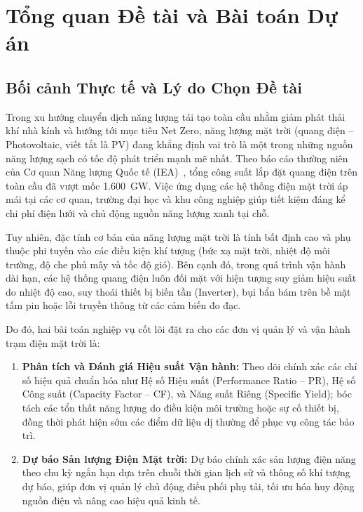 \documentclass[12pt, a4paper]{report}
\begin{document}
\chapter{Tổng quan Đề tài và Bài toán Dự án}
\label{chap:tongquan}

\section{Bối cảnh Thực tế và Lý do Chọn Đề tài}
\label{sec:lydo}

Trong xu hướng chuyển dịch năng lượng tái tạo toàn cầu nhằm giảm phát thải khí nhà kính và hướng tới mục tiêu Net Zero, năng lượng mặt trời (quang điện -- Photovoltaic, viết tắt là PV) đang khẳng định vai trò là một trong những nguồn năng lượng sạch có tốc độ phát triển mạnh mẽ nhất. Theo báo cáo thường niên của Cơ quan Năng lượng Quốc tế (IEA)~\cite{iea2023pvps}, tổng công suất lắp đặt quang điện trên toàn cầu đã vượt mốc 1.600~GW. Việc ứng dụng các hệ thống điện mặt trời áp mái tại các cơ quan, trường đại học và khu công nghiệp giúp tiết kiệm đáng kể chi phí điện lưới và chủ động nguồn năng lượng xanh tại chỗ.

Tuy nhiên, đặc tính cơ bản của năng lượng mặt trời là tính bất định cao và phụ thuộc phi tuyến vào các điều kiện khí tượng (bức xạ mặt trời, nhiệt độ môi trường, độ che phủ mây và tốc độ gió). Bên cạnh đó, trong quá trình vận hành dài hạn, các hệ thống quang điện luôn đối mặt với hiện tượng suy giảm hiệu suất do nhiệt độ cao, suy thoái thiết bị biến tần (Inverter), bụi bẩn bám trên bề mặt tấm pin hoặc lỗi truyền thông từ các cảm biến đo đạc.

Do đó, hai bài toán nghiệp vụ cốt lõi đặt ra cho các đơn vị quản lý và vận hành trạm điện mặt trời là:
\begin{enumerate}[noitemsep]
    \item \textbf{Phân tích và Đánh giá Hiệu suất Vận hành:} Theo dõi chính xác các chỉ số hiệu quả chuẩn hóa như Hệ số Hiệu suất (Performance Ratio -- PR), Hệ số Công suất (Capacity Factor -- CF), và Năng suất Riêng (Specific Yield); bóc tách các tổn thất năng lượng do điều kiện môi trường hoặc sự cố thiết bị, đồng thời phát hiện sớm các điểm dữ liệu dị thường để phục vụ công tác bảo trì.
    \item \textbf{Dự báo Sản lượng Điện Mặt trời:} Dự báo chính xác sản lượng điện năng theo chu kỳ ngắn hạn dựa trên chuỗi thời gian lịch sử và thông số khí tượng dự báo, giúp đơn vị quản lý chủ động điều phối phụ tải, tối ưu hóa huy động nguồn điện và nâng cao hiệu quả kinh tế.
\end{enumerate}
\end{document}
